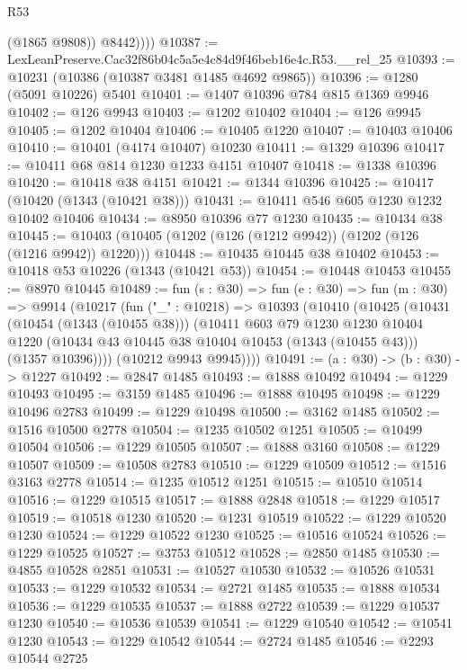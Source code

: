 \begin{lexlean}{R53}
\begin{coremodule}
              (@1865 @9808))
            @8442))))
@10387 := LexLeanPreserve.Cac32f86b04c5a5e4c84d9f46beb16e4c.R53.__rel_25
@10393 := @10231 (@10386 (@10387 @3481 @1485 @4692 @9865))
@10396 := @1280 (@5091 @10226) @5401
@10401 := @1407 @10396 @784 @815 @1369 @9946
@10402 := @126 @9943
@10403 := @1202 @10402
@10404 := @126 @9945
@10405 := @1202 @10404
@10406 := @10405 @1220
@10407 := @10403 @10406
@10410 := @10401 (@4174 @10407) @10230
@10411 := @1329 @10396
@10417 := @10411 @68 @814 @1230 @1233 @4151 @10407
@10418 := @1338 @10396
@10420 := @10418 @38 @4151
@10421 := @1344 @10396
@10425 := @10417 (@10420 (@1343 (@10421 @38)))
@10431 := @10411 @546 @605 @1230 @1232 @10402 @10406
@10434 := @8950 @10396 @77 @1230
@10435 := @10434 @38
@10445 := @10403 (@10405 (@1202 (@126 (@1212 @9942)) (@1202 (@126 (@1216 @9942)) @1220)))
@10448 := @10435 @10445 @38 @10402
@10453 := @10418 @53 @10226 (@1343 (@10421 @53))
@10454 := @10448 @10453
@10455 := @8970 @10445
@10489 := fun (s : @30) =>
  fun (e : @30) =>
  fun (m : @30) =>
  @9914
    (@10217
      (fun ("_" : @10218) =>
      @10393
        (@10410
          (@10425
            (@10431
              (@10454 (@1343 (@10455 @38)))
              (@10411
                @603
                @79
                @1230
                @1230
                @10404
                @1220
                (@10434 @43 @10445 @38 @10404 @10453 (@1343 (@10455 @43)))
                (@1357 @10396))))
          (@10212 @9943 @9945))))
@10491 := (a : @30) -> (b : @30) -> @1227
@10492 := @2847 @1485
@10493 := @1888 @10492
@10494 := @1229 @10493
@10495 := @3159 @1485
@10496 := @1888 @10495
@10498 := @1229 @10496 @2783
@10499 := @1229 @10498
@10500 := @3162 @1485
@10502 := @1516 @10500 @2778
@10504 := @1235 @10502 @1251
@10505 := @10499 @10504
@10506 := @1229 @10505
@10507 := @1888 @3160
@10508 := @1229 @10507
@10509 := @10508 @2783
@10510 := @1229 @10509
@10512 := @1516 @3163 @2778
@10514 := @1235 @10512 @1251
@10515 := @10510 @10514
@10516 := @1229 @10515
@10517 := @1888 @2848
@10518 := @1229 @10517
@10519 := @10518 @1230
@10520 := @1231 @10519
@10522 := @1229 @10520 @1230
@10524 := @1229 @10522 @1230
@10525 := @10516 @10524
@10526 := @1229 @10525
@10527 := @3753 @10512
@10528 := @2850 @1485
@10530 := @4855 @10528 @2851
@10531 := @10527 @10530
@10532 := @10526 @10531
@10533 := @1229 @10532
@10534 := @2721 @1485
@10535 := @1888 @10534
@10536 := @1229 @10535
@10537 := @1888 @2722
@10539 := @1229 @10537 @1230
@10540 := @10536 @10539
@10541 := @1229 @10540
@10542 := @10541 @1230
@10543 := @1229 @10542
@10544 := @2724 @1485
@10546 := @2293 @10544 @2725

\end{coremodule}
\end{lexlean}
